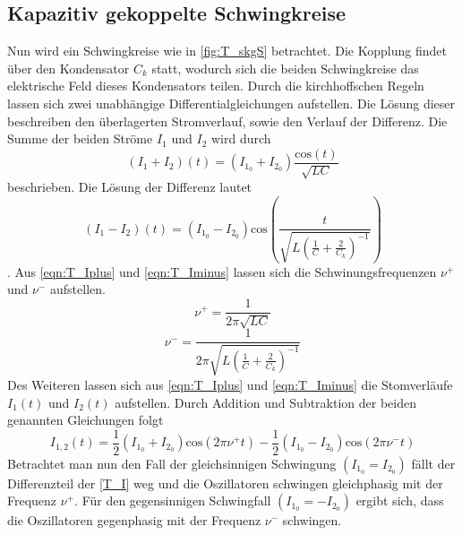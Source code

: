 \subsection{Kapazitiv gekoppelte Schwingkreise}
\label{T_KgS}
Nun wird ein Schwingkreise wie in \autoref{fig:T_skgS} betrachtet. Die Kopplung findet über den Kondensator $C_k$ statt, wodurch sich die beiden Schwingkreise das elektrische Feld dieses Kondensators
teilen. Durch die kirchhoffschen Regeln lassen sich zwei unabhängige Differentialgleichungen aufstellen. Die Lösung dieser beschreiben den überlagerten Stromverlauf, sowie den Verlauf der Differenz.
Die Summe der beiden Ströme $I_1$ und $I_2$ wird durch 
\begin{equation}
    \label{eqn:T_Iplus}
    \left(I_1 + I_2\right)\left(t\right) = \left(I_{1_0} + I_{2_0}\right)\frac{\text{cos}\left(t\right)}{\sqrt{LC}}
\end{equation}
beschrieben. Die Lösung der Differenz lautet
\begin{equation}
    \label{eqn:T_Iminus}
    \left(I_1 - I_2\right)\left(t\right) = \left(I_{1_0} - I_{2_0}\right)\text{cos}\left(\frac{t}{\sqrt{L\left(\frac{1}{C}+\frac{2}{C_k}\right)^{-1}}}\right)
\end{equation}.
Aus \autoref{eqn:T_Iplus} und \autoref{eqn:T_Iminus} lassen sich die Schwinungsfrequenzen $\nu^+$ und $\nu^-$ aufstellen.
\begin{equation}
    \label{eqn:T_nup}
    \nu^+ = \frac{1}{2\pi\sqrt{LC}}
\end{equation}
\begin{equation}
    \label{T_num}
    \nu^- =  \frac{1}{2\pi\sqrt{L\left(\frac{1}{C}+\frac{2}{C_k}\right)^{-1}}}
\end{equation}
Des Weiteren lassen sich aus \autoref{eqn:T_Iplus} und \autoref{eqn:T_Iminus} die Stomverläufe $I_1(t)$ und $I_2(t)$ aufstellen. Durch Addition und Subtraktion der beiden genannten Gleichungen 
folgt 
\begin{equation}
    \label{T_I}
    I_{1,2}(t) = \frac{1}{2}\left(I_{1_0} + I_{2_0}\right)\text{cos}\left(2\pi\nu^+ t\right) - \frac{1}{2}\left(I_{1_0} - I_{2_0}\right)\text{cos}\left(2\pi\nu^- t\right)
\end{equation}
Betrachtet man nun den Fall der gleichsinnigen Schwingung $\left(I_{1_0} = I_{2_0}\right)$ fällt der Differenzteil der \autoref{T_I} weg und die Oszillatoren schwingen gleichphasig mit der Frequenz 
$\nu^+$.
Für den gegensinnigen Schwingfall $\left(I_{1_0} = -I_{2_0}\right)$ ergibt sich, dass die Oszillatoren gegenphasig mit der Frequenz $\nu^-$ schwingen.
